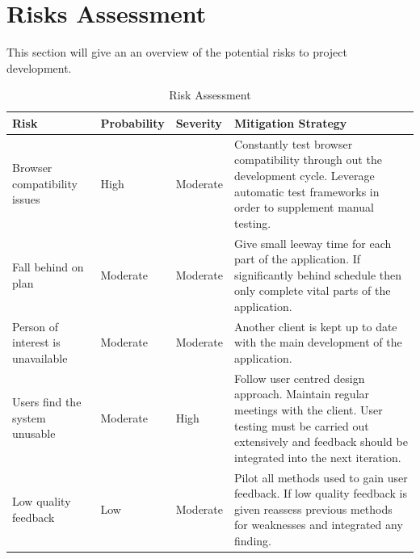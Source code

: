 \documentclass[a4paper,oneside,11pt]{report}
\begin{document}
\chapter{Risks Assessment}
 	This section will give an an overview of the potential risks to project development.
\begin{center}
	\begin{table}[!ht]
    \begin{tabular}[ht]{| l | l | l | p{5cm} |}
    \hline
    Risk & Probability & Severity & Mitigation Strategy \\ 
    \hline
    Browser compatibility issues & High & Moderate & Constantly test browser compatibility through out the development cycle. Leverage automatic test frameworks in order to supplement manual testing.\\ \hline
    Fall behind on plan & Moderate & Moderate & Give small leeway time for each part of the application. If significantly behind schedule then only complete vital parts of the application.  \\ \hline
    Person of interest is unavailable & Moderate & Moderate &  Another client is kept up to date with the main development of the application.\\ 
    \hline
Users find the system unusable & Moderate & High & Follow user centred design approach. Maintain regular meetings with the client. User testing must be carried out extensively and feedback should be integrated into the next iteration. \\ 
    \hline
    Low quality feedback & Low & Moderate & Pilot all methods used to gain user feedback. If low quality feedback is given reassess previous methods for weaknesses and integrated any finding. \\ 
    \hline
    
    \end{tabular}
    \caption{Risk Assessment}
\label{tab:xyz}
    \end{table}
    \end{center}
\end{document}
